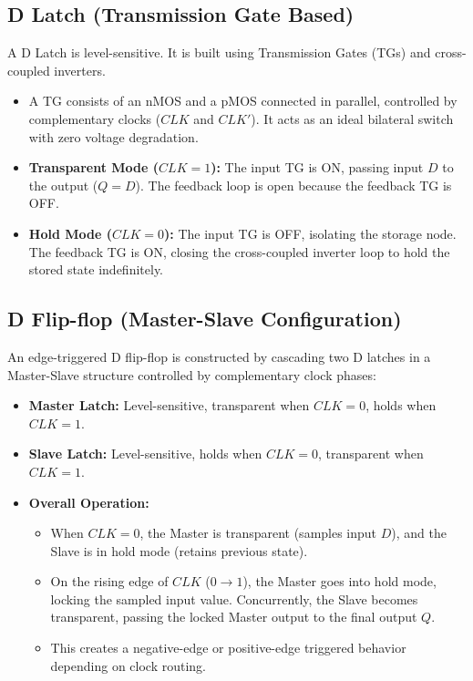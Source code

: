 \documentclass[12pt,a4paper]{article}
\begin{document}
\subsection{D Latch (Transmission Gate Based)}
A D Latch is level-sensitive. It is built using Transmission Gates (TGs) and cross-coupled inverters.
\begin{itemize}[leftmargin=*, itemsep=3.5pt]
  \item A TG consists of an nMOS and a pMOS connected in parallel, controlled by complementary clocks ($CLK$ and $CLK'$). It acts as an ideal bilateral switch with zero voltage degradation.
  \item \textbf{Transparent Mode ($CLK = 1$):} The input TG is ON, passing input $D$ to the output ($Q = D$). The feedback loop is open because the feedback TG is OFF.
  \item \textbf{Hold Mode ($CLK = 0$):} The input TG is OFF, isolating the storage node. The feedback TG is ON, closing the cross-coupled inverter loop to hold the stored state indefinitely.
\end{itemize}

\subsection{D Flip-flop (Master-Slave Configuration)}
An edge-triggered D flip-flop is constructed by cascading two D latches in a Master-Slave structure controlled by complementary clock phases:
\begin{itemize}[leftmargin=*, itemsep=3.5pt]
  \item \textbf{Master Latch:} Level-sensitive, transparent when $CLK=0$, holds when $CLK=1$.
  \item \textbf{Slave Latch:} Level-sensitive, holds when $CLK=0$, transparent when $CLK=1$.
  \item \textbf{Overall Operation:}
    \begin{itemize}
      \item When $CLK = 0$, the Master is transparent (samples input $D$), and the Slave is in hold mode (retains previous state).
      \item On the rising edge of $CLK$ ($0 \to 1$), the Master goes into hold mode, locking the sampled input value. Concurrently, the Slave becomes transparent, passing the locked Master output to the final output $Q$.
      \item This creates a negative-edge or positive-edge triggered behavior depending on clock routing.
    \end{itemize}
\end{itemize}
\end{document}
